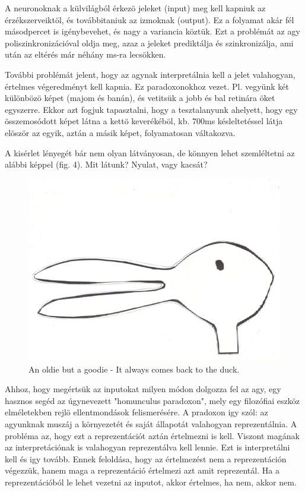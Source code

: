 \documentclass{article}
\begin{document}
A neuronoknak a külvilágból érkezö jeleket (input) meg kell kapniuk az érzékszerveiktöl, és továbbitaniuk az izmoknak (output). Ez a folyamat akár fél másodpercet is igénybevehet, és nagy a variancia köztük. Ezt a problémát az agy poliszinkronizációval oldja meg, azaz a jeleket prediktálja és szinkronizálja, ami után az eltérés már néhány ms-ra lecsökken. \newline

További problémát jelent, hogy az agynak interpretálnia kell a jelet valahogyan, értelmes végeredményt kell kapnia. Ez paradoxonokhoz vezet. Pl. vegyünk két különbözö képet (majom és banán), és vetitsük a jobb és bal retinára öket egyszerre. Ekkor azt fogjuk tapasztalni, hogy a tesztalanyunk ahelyett, hogy egy összemosódott képet látna a kettö keverékéböl, kb. 700ms késleltetéssel látja elöször az egyik, aztán a másik képet, folyamatosan váltakozva. \newline

A kisérlet lényegét bár nem olyan látványosan, de könnyen lehet szemléltetni az alábbi képpel (fig. 4). Mit látunk? Nyulat, vagy kacsát? \newline

\begin{figure}[h!]
\centering
\includegraphics[width=\textwidth,height=\textheight,keepaspectratio]{duckrabbit.png}
\caption{An oldie but a goodie - It always comes back to the duck.}
\label{fig:duckrabbit}
\end{figure}

Ahhoz, hogy megértsük az inputokat milyen módon dolgozza fel az agy, egy hasznos segéd az úgynevezett "homunculus paradoxon", mely egy filozófiai eszköz elméletekben rejlö ellentmondások felismerésére. A pradoxon igy szól: az agyunknak muszáj a környezetét és saját állapotát valahogyan reprezentálnia. A probléma az, hogy ezt a  reprezentációt aztán értelmezni is kell. Viszont magának az interpretációnak is valahogyan reprezentálva kell lennie. Ezt is interpretálni kell és igy tovább. Ennek feloldása, hogy az értelmezést nem a reprezentáción végezzük, hanem maga a reprezentáció értelmezi azt amit reprezentál. Ha a reprezentációból le lehet vezetni az inputot, akkor értelmes, ha nem, akkor nem. \newline
\end{document}
